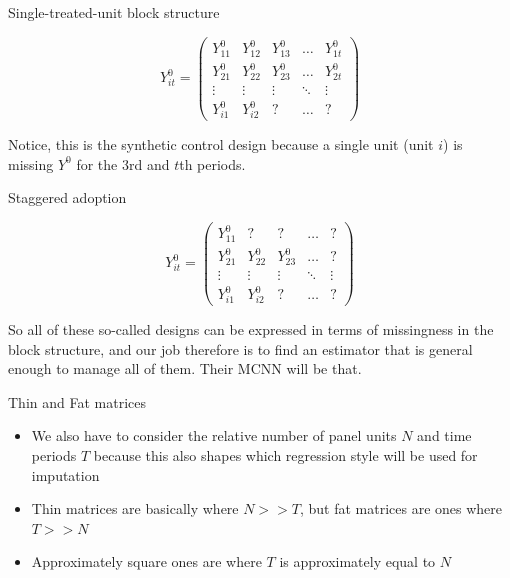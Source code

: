 \documentclass{beamer}
\begin{document}
\begin{frame}{Single-treated-unit block structure}

\begin{center}
\[ Y^0_{it}  =\begin{pmatrix}
    Y^0_{11} & Y^0_{12} & Y^0_{13} & \dots  & Y^0_{1t} \\
    Y^0_{21} & Y^0_{22} & Y^0_{23} & \dots  & Y^0_{2t}  \\
    \vdots & \vdots & \vdots & \ddots & \vdots \\
    Y^0_{i1} & Y^0_{i2} & ? & \dots  & ?
\end{pmatrix}\]
\end{center}

Notice, this is the synthetic control design because a single unit (unit $i$) is missing $Y^0$ for the 3rd and $t$th periods.

\end{frame}

\begin{frame}{Staggered adoption}

\begin{center}
\[ Y^0_{it}  =\begin{pmatrix}
    Y^0_{11} & ? & ? & \dots  & ? \\
    Y^0_{21} & Y^0_{22} & Y^0_{23} & \dots  & ? \\
    \vdots & \vdots & \vdots & \ddots & \vdots \\
    Y^0_{i1} & Y^0_{i2} & ? & \dots  & ?
\end{pmatrix}\]
\end{center}

So all of these so-called designs can be expressed in terms of missingness in the block structure, and our job therefore is to find an estimator that is general enough to manage all of them.  Their MCNN will be that.

\end{frame}


\begin{frame}{Thin and Fat matrices}

\begin{itemize}
\item We also have to consider the relative number of panel units $N$ and time periods $T$ because this also shapes which regression style will be used for imputation
\item Thin matrices are basically where $N>>T$, but fat matrices are ones where $T>>N$
\item Approximately square ones are where $T$ is approximately equal to $N$
\end{itemize}

\end{frame}
\end{document}
